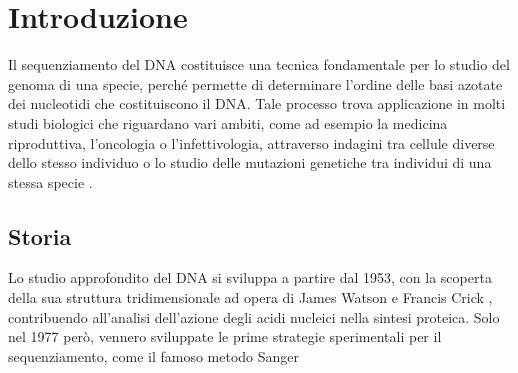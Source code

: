 \documentclass[crop=false, class=book]{standalone}
\begin{document}
	\chapter{Introduzione}
	
	Il sequenziamento del DNA costituisce una tecnica fondamentale per lo studio del genoma di una specie, perché permette di determinare l'ordine delle basi azotate dei nucleotidi che costituiscono il DNA. Tale processo trova applicazione in molti studi biologici che riguardano vari ambiti, come ad esempio la medicina riproduttiva, l'oncologia o l'infettivologia, attraverso indagini tra cellule diverse dello stesso individuo o lo studio delle mutazioni genetiche tra individui di una stessa specie \cite{shendure2012expanding}. 
	
	
	\section{Storia}
	Lo studio approfondito del DNA si sviluppa a partire dal 1953, con la scoperta della sua struttura tridimensionale ad opera di James Watson e Francis Crick \cite{watson1953molecular}, contribuendo all'analisi dell'azione degli acidi nucleici nella sintesi proteica. Solo nel 1977 però, vennero sviluppate le prime strategie sperimentali per il sequenziamento, come il famoso metodo Sanger \cite{sanger1977DNA, sanger1977nucleotide}
	
	
	
	
	
	
\end{document}
